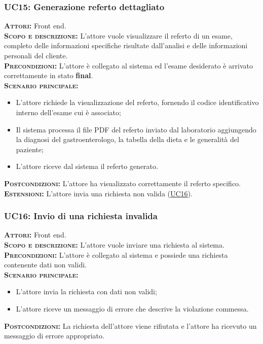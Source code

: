 \subsubsection{UC15: Generazione referto dettagliato}
\label{sec:UC15}
\textsc{\textbf{Attori:}} Front end.\\
\textsc{\textbf{Scopo e descrizione:}} L'attore vuole visualizzare il referto di un esame, completo delle informazioni specifiche risultate dall'analisi e delle informazioni personali del cliente.\\
\textsc{\textsc{\textbf{Precondizioni:}}} L'attore è collegato al sistema ed l'esame desiderato è arrivato correttamente in stato \textbf{final}.\\
\textsc{\textbf{Scenario principale:}}
\begin{itemize}
    \item L'attore richiede la visualizzazione del referto, fornendo il codice identificativo interno dell'esame cui è associato;
    \item Il sistema processa il file PDF del referto inviato dal laboratorio aggiungendo la diagnosi del gastroenterologo, la tabella della dieta e le generalità del paziente;
    \item L'attore riceve dal sistema il referto generato.
\end{itemize}
\textsc{\textbf{Postcondizioni:}} L'attore ha visualizzato correttamente il referto specifico.\\
\textsc{\textbf{Estensioni:}} L'attore invia una richiesta non valida (\hyperref[sec:UC16]{UC16}).

\subsubsection{UC16: Invio di una richiesta invalida}
\label{sec:UC16}
\textsc{\textbf{Attori:}} Front end.\\
\textsc{\textbf{Scopo e descrizione:}} L'attore vuole inviare una richiesta al sistema.\\
\textsc{\textsc{\textbf{Precondizioni:}}} L'attore è collegato al sistema e possiede una richiesta contenente dati non validi.\\
\textsc{\textbf{Scenario principale:}}
\begin{itemize}
    \item L'attore invia la richiesta con dati non validi;
    \item L'attore riceve un messaggio di errore che descrive la violazione commessa.
\end{itemize}
\textsc{\textbf{Postcondizioni:}} La richiesta dell'attore viene rifiutata e l'attore ha ricevuto un messaggio di errore appropriato.


